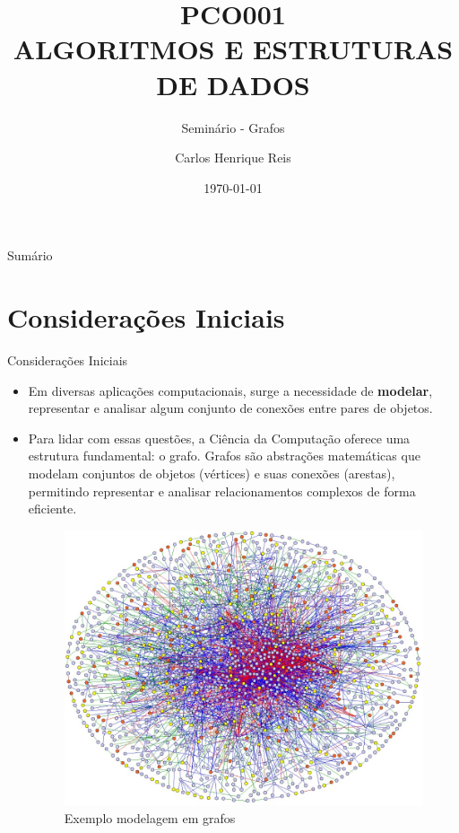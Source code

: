 \documentclass{if-beamer}
\title[PCO001]{PCO001\\ALGORITMOS E ESTRUTURAS DE DADOS}
\subtitle{Seminário - Grafos}
\author{Carlos Henrique Reis}
\institute[UNIFEI]{
  Universidade Federal de Itajubá - UNIFEI
}
\date{\today}
\begin{document}
\begin{frame}
  \titlepage
\end{frame}

\begin{frame}{Sumário}
  \tableofcontents
\end{frame}


\section{Considerações Iniciais}

\begin{frame}{Considerações Iniciais}
\begin{itemize}
\justifying
\item Em diversas aplicações computacionais, surge a necessidade de \textbf{modelar}, representar e analisar algum conjunto de conexões entre pares de objetos.\pause

\item Para lidar com essas questões, a Ciência da Computação oferece uma estrutura fundamental: o grafo. Grafos são abstrações matemáticas que modelam conjuntos de objetos (vértices) e suas conexões (arestas), permitindo representar e analisar relacionamentos complexos de forma eficiente.

\begin{figure}
\includegraphics[scale=0.2]{Figuras/slide-1.jpg} 
\caption{Exemplo modelagem em grafos  }
\end{figure}

\end{itemize} 
\end{frame}
\end{document}
